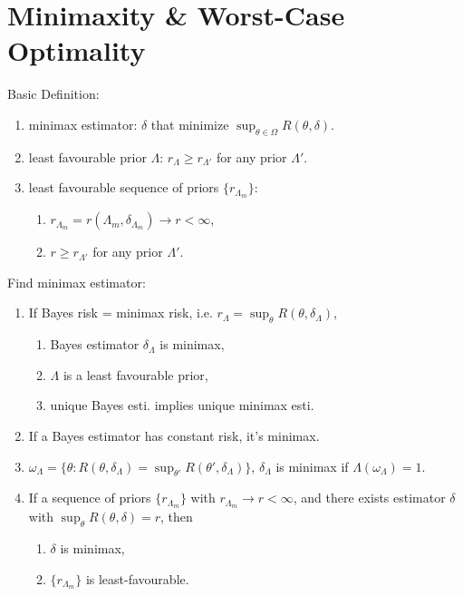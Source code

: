 \section*{Minimaxity \& Worst-Case Optimality}

Basic Definition: \begin{enumerate}[
        leftmargin = 2em,
    ]
    \item minimax estimator: $\delta$ that minimize $\sup_{\theta\in\Omega}R(\theta, \delta)$.
    \item least favourable prior $\Lambda$: $r_{\Lambda} \geq r_{\Lambda'}$ for any prior $\Lambda'$.
    \item least favourable sequence of priors $\{r_{\Lambda_m}\}$: \begin{enumerate}
        \item $r_{\Lambda_m} = r(\Lambda_m, \delta_{\Lambda_m}) \rightarrow r < \infty$,
        \item $r \geq r_{\Lambda'}$ for any prior $\Lambda'$.
    \end{enumerate}
\end{enumerate}

Find minimax estimator: \begin{enumerate}[
        leftmargin = 2em,
    ]
    \item If Bayes risk = minimax risk, i.e. $r_\Lambda = \sup_\theta R(\theta, \delta_{\Lambda})$, \begin{enumerate}
        \item Bayes estimator $\delta_{\Lambda}$ is minimax,
        \item $\Lambda$ is a least favourable prior,
        \item unique Bayes esti. implies unique minimax esti.
    \end{enumerate}
    \item If a Bayes estimator has constant risk, it's minimax.
    \item $\omega_\Lambda \!=\! \{\theta\!: R(\theta, \delta_\Lambda) \!=\! \sup_{\theta'}\! R(\theta', \delta_\Lambda)\}$, $\delta_\Lambda$ is minimax if $\Lambda(\omega_\Lambda) \!=\! 1$.
    \item If a sequence of priors $\{r_{\Lambda_m}\}$ with $r_{\Lambda_m}\rightarrow r < \infty$, and there exists estimator $\delta$ with $\sup_{\theta} R(\theta, \delta) = r$, then 
    \begin{enumerate}
        \item $\delta$ is minimax,
        \item $\{r_{\Lambda_m}\}$ is least-favourable.
    \end{enumerate}
\end{enumerate}

